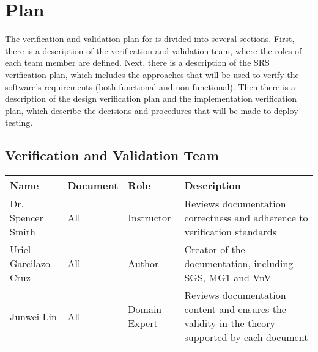 \documentclass[12pt, titlepage]{article}
\begin{document}

\section{Plan}\label{sec:plan}

The verification and validation plan for \progname{} is divided into several sections. 
First, there is a description of the verification and validation team, where the roles of
each team member are defined. Next, there is a description of the SRS verification plan, 
which includes the approaches that will be used to verify the software's requirements 
(both functional and non-functional). Then there is a description of the design verification
plan and the implementation verification plan, which describe the decisions and procedures 
that will be made to deploy testing.





\subsection{Verification and Validation Team}

\begin{table}[h]
  \begin{tabular}{|p{3cm}|p{2cm}|p{2.5cm}|p{6cm}|}
  \hline
  Name & Document & Role & Description \\
  \hline
  Dr. Spencer Smith & All & Instructor & Reviews documentation correctness and adherence to verification standards \\
  \hline
  Uriel Garcilazo Cruz & All & Author & Creator of the documentation, including SGS, MG1 and VnV \\
  \hline
  Junwei Lin & All & Domain Expert & Reviews documentation content and ensures the validity in the theory supported by each document \\
  \hline
  \end{tabular}
\end{table}

\end{document}
